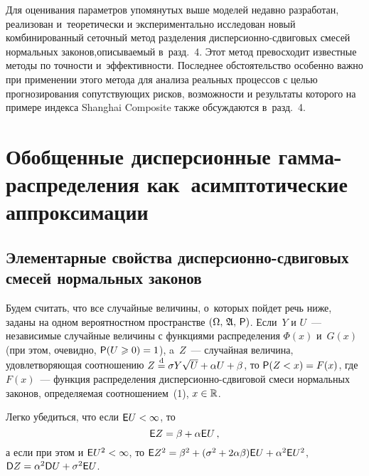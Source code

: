 \begin{multicols}{2}
Для оценивания параметров упомянутых выше моделей недавно
разработан, реализован и~тео\-ре\-ти\-чески и экспериментально исследован
новый комбинированный сеточный метод разделения
дис\-пер\-си\-он\-но-сдви\-го\-вых смесей нормальных законов,\linebreak описываемый 
в~разд.~4. Этот метод превосходит извест\-ные методы по точности 
и~эффективности. Последнее обстоятельство особенно важно при
применении этого метода для анализа реальных процессов с целью
прогнозирования со\-пут\-ст\-ву\-ющих рисков, возможности и результаты
которого на примере индекса Shanghai Composite также обсуждаются 
в~разд.~4.

\section{Обобщенные дисперсионные гамма-распределения 
как~асимптотические аппроксимации}

\subsection{Элементарные свойства дисперсионно-сдвиговых смесей
нормальных законов}

Будем считать, что все случайные величины, о~которых пойдет речь
ниже, заданы на одном вероятностном пространстве $(\Omega,\,
\mathfrak{A},\,{\sf P})$. Если~$Y$ и $U$~--- независимые случайные
величины с функциями распределения $\Phi(x)$ и~$G(x)$ (при этом,
очевидно, ${\sf P}(U\geqslant0)\hm=1$), a~$Z$~--- случайная величина,
удовлетворяющая соотношению $Z\eqd \sigma Y\sqrt{U}\hm+\alpha U
\hm+\beta$, то ${\sf P}(Z<x)\hm=F(x)$, где $F(x)$~--- функция распределения
дис\-пер\-си\-он\-но-сдви\-го\-вой смеси нормальных законов, определяемая
соотношением~(1), $x\hm\in\mathbb{R}$.

Легко убедиться, что если ${\sf E}U\hm<\infty$, то
\begin{equation}
{\sf E}Z=\beta+\alpha{\sf E}U\,,
\label{e4-kk}
\end{equation}
а если при этом и ${\sf E}U^2\hm<\infty$, то ${\sf
E}Z^2\hm=\beta^2\hm+(\sigma^2\hm+2\alpha\beta){\sf E}U\hm+\alpha^2{\sf E}U^2$,
${\sf D}Z\hm=\alpha^2{\sf D}U\hm+\sigma^2{\sf E}U$.


\end{multicols}
